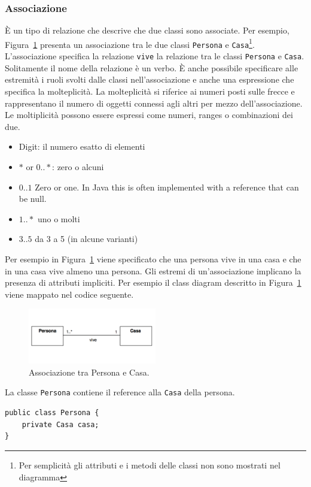 \documentclass{article}
\begin{document}
\subsubsection{Associazione} 
\`E un tipo di relazione che descrive che due classi sono associate. Per esempio, Figura~\ref{Fig:Associazione} presenta un associazione tra le due classi \texttt{Persona} e \texttt{Casa}\footnote{Per semplicit\`a gli attributi e i metodi delle classi non sono mostrati nel diagramma}. 
L'associazione specifica la relazione \texttt{vive} la relazione tra le classi  \texttt{Persona} e \texttt{Casa}.  Solitamente il nome della relazione \`e un verbo. \`E anche possibile specificare alle estremit\`a i ruoli svolti dalle classi nell'associazione e anche una espressione che specifica la molteplicit\`a. La molteplicit\`a si riferice ai numeri posti sulle frecce e rappresentano il numero di oggetti connessi agli altri per mezzo dell'associazione. Le moltiplicit\`a possono essere espressi come numeri, ranges o combinazioni dei due.
\begin{itemize}
\item Digit: il numero esatto di elementi
\item $*$ or $0..*$: zero o alcuni
\item $0..1$ Zero or one. In Java this is often implemented with a reference that can be null.
\item $1..*$ uno o molti
\item $3..5$ da 3 a 5 (in alcune varianti)
\end{itemize}
Per esempio in Figura~\ref{Fig:Associazione} viene specificato che una persona vive in una casa e che in una casa vive almeno una persona.
Gli estremi di un'associazione implicano la presenza di attributi impliciti. Per esempio il class diagram descritto in Figura~\ref{Fig:Associazione} viene mappato nel codice seguente.
\begin{figure}[h!]
  \centering
    \includegraphics[width=0.5\textwidth]{Img/Associazione.pdf}
      \caption{Associazione tra Persona e Casa.}
      \label{Fig:Associazione}
\end{figure}
La classe \texttt{Persona} contiene il reference alla \texttt{Casa} della persona.
\begin{lstlisting}
public class Persona {
    private Casa casa; 
}
\end{lstlisting}
\end{document}
